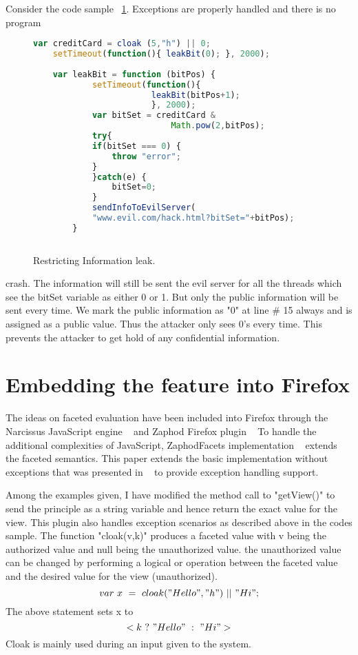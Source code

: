 Consider the code sample ~\ref{fig:JSInfoNoLeak}. Exceptions are properly handled and there is no program 
\begin{figure}
  \centering
\begin{lstlisting}[language=JavaScript] 
	var creditCard = cloak (5,"h") || 0;
	setTimeout(function(){ leakBit(0); }, 2000);
	
	var leakBit = function (bitPos) {
			setTimeout(function(){ 
						leakBit(bitPos+1); 
						}, 2000);
			var bitSet = creditCard & 
							Math.pow(2,bitPos);
			try{
			if(bitSet === 0) {
				throw "error";
			}
			}catch(e) {
				bitSet=0;
			}
			sendInfoToEvilServer(
			"www.evil.com/hack.html?bitSet="+bitPos);
		}
			
\end{lstlisting}
    \caption[Restricting Information leak.]
    {Restricting Information leak.}
    \label{fig:JSInfoNoLeak}
\end{figure}
crash. The information will still be sent the evil server for all the threads which see the bitSet variable as either 0 or 1. But only the public information will be sent every time. We mark the public information as "0" at line \# 15 always and is assigned as a public value. Thus the attacker only sees 0's every time. This prevents the attacker to get hold of any confidential information.

\section{Embedding the feature into Firefox}
The ideas on faceted evaluation have been included into Firefox through the Narcissus JavaScript engine ~\cite{Eich} and Zaphod Firefox plugin ~\cite{Zaphod} To handle the additional complexities of JavaScript, ZaphodFacets implementation ~\cite{ZaphodFacetes} extends the faceted semantics. This paper extends the basic implementation 
without exceptions that was presented in ~\cite{bib4} to provide exception handling support.

Among the examples given, I have modified the method call to "getView()" to send the principle as a string variable and hence return the exact value for the view. This plugin also handles exception scenarios as described above in the codes sample. The function "cloak(v,k)" produces a faceted value with v being the authorized value and null being the unauthorized value. the unauthorized value can be changed by performing a logical or operation between the faceted value and the desired value for the view (unauthorized).
$$
var\ x\ =\ cloak("Hello","h")\ ||\ "Hi";
$$
The above statement sets x to 
$$
<k\ ?\ "Hello"\ :\ "Hi">
$$
Cloak is mainly used during an input given to the system. 

